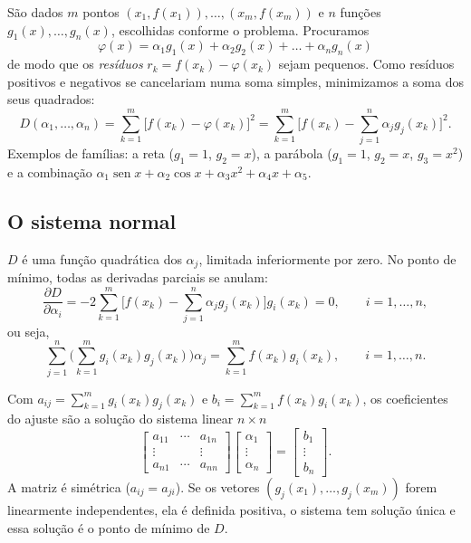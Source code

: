 São dados $m$ pontos $(x_1,f(x_1)),\dots,(x_m,f(x_m))$ e $n$ funções $g_1(x),\dots,g_n(x)$,
escolhidas conforme o problema. Procuramos
\[
\varphi(x)=\alpha_1g_1(x)+\alpha_2g_2(x)+\dots+\alpha_ng_n(x)
\]
de modo que os \emph{resíduos} $r_k=f(x_k)-\varphi(x_k)$ sejam pequenos. Como resíduos positivos e
negativos se cancelariam numa soma simples, minimizamos a soma dos seus quadrados:
\[
D(\alpha_1,\dots,\alpha_n)=\sum_{k=1}^{m}\big[f(x_k)-\varphi(x_k)\big]^2
=\sum_{k=1}^{m}\Big[f(x_k)-\sum_{j=1}^{n}\alpha_jg_j(x_k)\Big]^2 .
\]
Exemplos de famílias: a reta ($g_1=1$, $g_2=x$), a parábola ($g_1=1$, $g_2=x$, $g_3=x^2$) e a
combinação $\alpha_1\operatorname{sen}x+\alpha_2\cos x+\alpha_3x^2+\alpha_4x+\alpha_5$.

\subsection{O sistema normal}

$D$ é uma função quadrática dos $\alpha_j$, limitada inferiormente por zero. No ponto de mínimo, todas
as derivadas parciais se anulam:
\[
\frac{\partial D}{\partial\alpha_i}=-2\sum_{k=1}^{m}\Big[f(x_k)-\sum_{j=1}^{n}\alpha_jg_j(x_k)\Big]g_i(x_k)=0,
\qquad i=1,\dots,n,
\]
ou seja,
\[
\sum_{j=1}^{n}\Big(\sum_{k=1}^{m}g_i(x_k)g_j(x_k)\Big)\alpha_j=\sum_{k=1}^{m}f(x_k)g_i(x_k),\qquad i=1,\dots,n.
\]

\begin{definicao}
Com $a_{ij}=\sum_{k=1}^{m}g_i(x_k)g_j(x_k)$ e $b_i=\sum_{k=1}^{m}f(x_k)g_i(x_k)$, os coeficientes
do ajuste são a solução do sistema linear $n\times n$
\[
\begin{bmatrix}a_{11}&\cdots&a_{1n}\\ \vdots&&\vdots\\ a_{n1}&\cdots&a_{nn}\end{bmatrix}
\begin{bmatrix}\alpha_1\\ \vdots\\ \alpha_n\end{bmatrix}=
\begin{bmatrix}b_1\\ \vdots\\ b_n\end{bmatrix}.
\]
A matriz é simétrica ($a_{ij}=a_{ji}$). Se os vetores $(g_j(x_1),\dots,g_j(x_m))$ forem linearmente
independentes, ela é definida positiva, o sistema tem solução única e essa solução é o ponto de mínimo de $D$.
\end{definicao}

